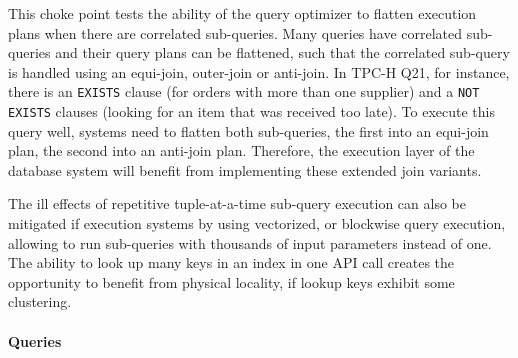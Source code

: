 
This choke point tests the ability of the query optimizer to flatten execution plans when there are correlated sub-queries. Many queries have correlated sub-queries and their query plans can be flattened,
such that the correlated sub-query is handled using an equi-join, outer-join or anti-join.
In TPC-H Q21, for instance, there is an \lstinline{EXISTS} clause (for orders with more than one supplier) and a \lstinline{NOT EXISTS} clauses (looking for an item that was received too late).
To execute this query well, systems need to flatten both sub-queries, the first into an equi-join plan, the second into an anti-join plan.
Therefore, the execution layer of the database system will benefit from implementing these extended join variants.

The ill effects of repetitive tuple-at-a-time sub-query execution can also be mitigated if execution systems by using vectorized, or blockwise query execution, allowing to run sub-queries with thousands of input parameters instead of one.
The ability to look up many keys in an index in one API call creates the opportunity to benefit from physical locality, if lookup keys exhibit some clustering.


\paragraph{Queries}
{\raggedright

}